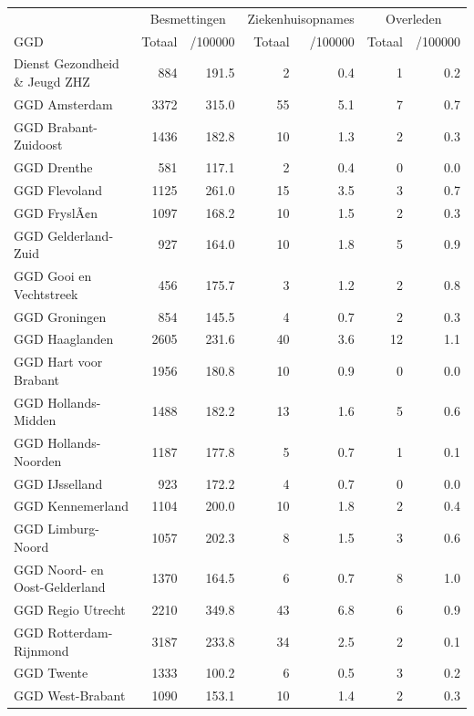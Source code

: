 \documentclass[
  english,
  man,floatsintext]{apa6}
\begin{document}
\begin{table}
\centering\begingroup\fontsize{10}{12}\selectfont

\begin{threeparttable}
\begin{tabular}{lrrrrrr}
\toprule
\multicolumn{1}{c}{ } & \multicolumn{2}{c}{Besmettingen} & \multicolumn{2}{c}{Ziekenhuisopnames} & \multicolumn{2}{c}{Overleden} \\
\cmidrule(l{3pt}r{3pt}){2-3} \cmidrule(l{3pt}r{3pt}){4-5} \cmidrule(l{3pt}r{3pt}){6-7}
GGD & Totaal & /100000 & Totaal & /100000 & Totaal & /100000\\
\midrule
Dienst Gezondheid \& Jeugd ZHZ & 884 & 191.5 & 2 & 0.4 & 1 & 0.2\\
GGD Amsterdam & 3372 & 315.0 & 55 & 5.1 & 7 & 0.7\\
GGD Brabant-Zuidoost & 1436 & 182.8 & 10 & 1.3 & 2 & 0.3\\
GGD Drenthe & 581 & 117.1 & 2 & 0.4 & 0 & 0.0\\
GGD Flevoland & 1125 & 261.0 & 15 & 3.5 & 3 & 0.7\\
GGD FryslÃ¢n & 1097 & 168.2 & 10 & 1.5 & 2 & 0.3\\
GGD Gelderland-Zuid & 927 & 164.0 & 10 & 1.8 & 5 & 0.9\\
GGD Gooi en Vechtstreek & 456 & 175.7 & 3 & 1.2 & 2 & 0.8\\
GGD Groningen & 854 & 145.5 & 4 & 0.7 & 2 & 0.3\\
GGD Haaglanden & 2605 & 231.6 & 40 & 3.6 & 12 & 1.1\\
GGD Hart voor Brabant & 1956 & 180.8 & 10 & 0.9 & 0 & 0.0\\
GGD Hollands-Midden & 1488 & 182.2 & 13 & 1.6 & 5 & 0.6\\
GGD Hollands-Noorden & 1187 & 177.8 & 5 & 0.7 & 1 & 0.1\\
GGD IJsselland & 923 & 172.2 & 4 & 0.7 & 0 & 0.0\\
GGD Kennemerland & 1104 & 200.0 & 10 & 1.8 & 2 & 0.4\\
GGD Limburg-Noord & 1057 & 202.3 & 8 & 1.5 & 3 & 0.6\\
GGD Noord- en Oost-Gelderland & 1370 & 164.5 & 6 & 0.7 & 8 & 1.0\\
GGD Regio Utrecht & 2210 & 349.8 & 43 & 6.8 & 6 & 0.9\\
GGD Rotterdam-Rijnmond & 3187 & 233.8 & 34 & 2.5 & 2 & 0.1\\
GGD Twente & 1333 & 100.2 & 6 & 0.5 & 3 & 0.2\\
GGD West-Brabant & 1090 & 153.1 & 10 & 1.4 & 2 & 0.3\\

\end{tabular}
\end{threeparttable}
\end{table}
\end{document}
